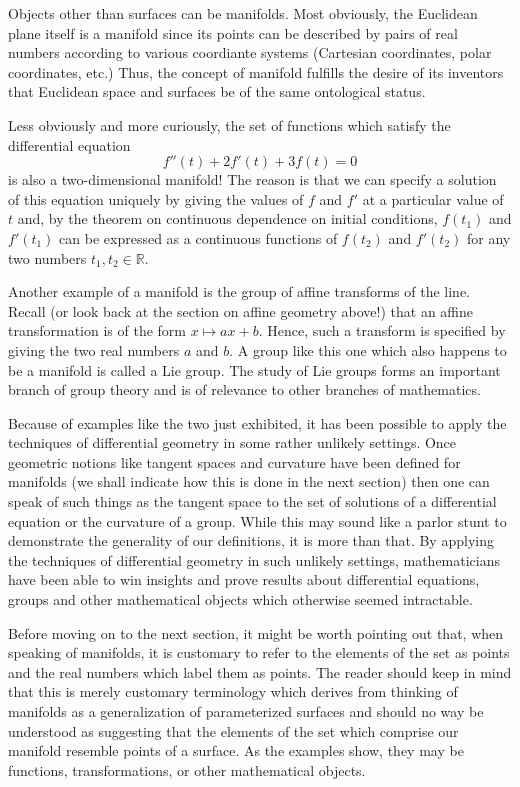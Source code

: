\documentclass[12pt]{article}
\begin{document}
Objects other than surfaces can be manifolds.  Most obviously, the
Euclidean plane itself is a manifold since its points can be described
by pairs of real numbers according to various coordiante systems
(Cartesian coordinates, polar coordinates, etc.)  Thus, the concept of
manifold fulfills the desire of its inventors that Euclidean space and
surfaces be of the same ontological status.

Less obviously and more curiously, the set of functions which satisfy
the differential equation 
 $$f''(t) + 2 f'(t) + 3 f(t) = 0$$
is also a two-dimensional manifold!  The reason is that we can specify
a solution of this equation uniquely by giving the values of $f$ and
$f'$ at a particular value of $t$ and, by the theorem on continuous
dependence on initial conditions, $f(t_1)$ and $f'(t_1)$ can be
expressed as a continuous functions of $f(t_2)$ and $f'(t_2)$ for any
two numbers $t_1, t_2 \in \mathbb{R}$.

Another example of a manifold is the group of affine transforms of the
line.  Recall (or look back at the section on affine geometry above!)
that an affine transformation is of the form $x \mapsto ax + b$.
Hence, such a transform is specified by giving the two real numbers
$a$ and $b$.  A group like this one which also happens to be a
manifold is called a Lie group.  The study of Lie groups forms an
important branch of group theory and is of relevance to other branches
of mathematics.

Because of examples like the two just exhibited, it has been possible
to apply the techniques of differential geometry in some rather
unlikely settings.  Once geometric notions like tangent spaces and
curvature have been defined for manifolds (we shall indicate how this
is done in the next section) then one can speak of such things as the
tangent space to the set of solutions of a differential equation or
the curvature of a group.  While this may sound like a parlor stunt to
demonstrate the generality of our definitions, it is more than that.
By applying the techniques of differential geometry in such unlikely
settings, mathematicians have been able to win insights and prove
results about differential equations, groups and other mathematical
objects which otherwise seemed intractable.

Before moving on to the next section, it might be worth pointing out
that, when speaking of manifolds, it is customary to refer to the
elements of the set as points and the real numbers which label them as
points.  The reader should keep in mind that this is merely customary
terminology which derives from thinking of manifolds as a
generalization of parameterized surfaces and should no way be
understood as suggesting that the elements of the set which comprise
our manifold resemble points of a surface.  As the examples show, they
may be functions, transformations, or other mathematical objects.
\end{document}
